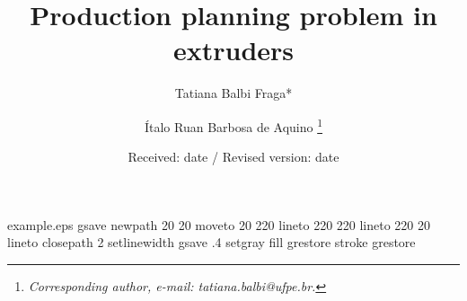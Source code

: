 %
%
%
%
\begin{filecontents*}{example.eps}
gsave
newpath
  20 20 moveto
  20 220 lineto
  220 220 lineto
  220 20 lineto
closepath
2 setlinewidth
gsave
  .4 setgray fill
grestore
stroke
grestore
\end{filecontents*}
%
\documentclass[global,referee]{svjour}
%
\usepackage{graphics}
%
%

%
\title{Production planning problem in extruders}
\author{Tatiana Balbi Fraga* \and Ítalo Ruan Barbosa de Aquino%
\thanks{\emph{Corresponding author, e-mail: tatiana.balbi@ufpe.br.}}%
}                     %
%
%
%
\date{Received: date / Revised version: date}
%
\maketitle
%
\begin{abstract}
Insert your abstract here.
\end{abstract}
%
\section{Introduction}
\label{intro}
Your text comes here. Separate text sections with


